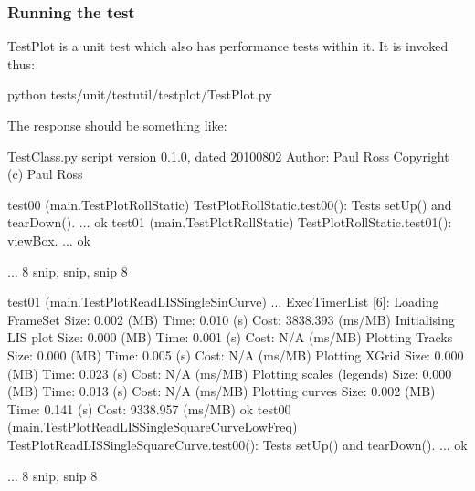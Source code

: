 \documentclass[letterpaper,10pt,english]{sphinxmanual}
\begin{document}
\subsubsection{Running the test}
\label{\detokenize{testing/test_plot:running-the-test}}
TestPlot is a unit test which also has performance tests within it. It is invoked thus:

\begin{sphinxVerbatim}[commandchars=\\\{\}]
\PYGZdl{} python tests/unit/test\PYGZus{}util/test\PYGZus{}plot/TestPlot.py
\end{sphinxVerbatim}

The response should be something like:

\begin{sphinxVerbatim}[commandchars=\\\{\}]
TestClass.py script version \PYGZdq{}0.1.0\PYGZdq{}, dated 2010\PYGZhy{}08\PYGZhy{}02
Author: Paul Ross
Copyright (c) Paul Ross

test\PYGZus{}00 (\PYGZus{}\PYGZus{}main\PYGZus{}\PYGZus{}.TestPlotRollStatic)
TestPlotRollStatic.test\PYGZus{}00(): Tests setUp() and tearDown(). ... ok
test\PYGZus{}01 (\PYGZus{}\PYGZus{}main\PYGZus{}\PYGZus{}.TestPlotRollStatic)
TestPlotRollStatic.test\PYGZus{}01(): viewBox. ... ok

... 8\PYGZlt{}\PYGZhy{}\PYGZhy{}\PYGZhy{}\PYGZhy{}\PYGZhy{}\PYGZhy{}\PYGZhy{}\PYGZhy{} snip, snip, snip \PYGZhy{}\PYGZhy{}\PYGZhy{}\PYGZhy{}\PYGZhy{}\PYGZhy{}\PYGZhy{}\PYGZhy{}\PYGZgt{}8

test\PYGZus{}01 (\PYGZus{}\PYGZus{}main\PYGZus{}\PYGZus{}.TestPlotReadLIS\PYGZus{}SingleSinCurve) ...  ExecTimerList [6]:
 Loading FrameSet          Size:    0.002 (MB) Time:    0.010 (s) Cost:   3838.393 (ms/MB)
 Initialising LIS plot     Size:    0.000 (MB) Time:    0.001 (s) Cost:        N/A (ms/MB)
 Plotting Tracks           Size:    0.000 (MB) Time:    0.005 (s) Cost:        N/A (ms/MB)
 Plotting XGrid            Size:    0.000 (MB) Time:    0.023 (s) Cost:        N/A (ms/MB)
 Plotting scales (legends) Size:    0.000 (MB) Time:    0.013 (s) Cost:        N/A (ms/MB)
 Plotting curves           Size:    0.002 (MB) Time:    0.141 (s) Cost:   9338.957 (ms/MB)  ok
test\PYGZus{}00 (\PYGZus{}\PYGZus{}main\PYGZus{}\PYGZus{}.TestPlotReadLIS\PYGZus{}SingleSquareCurveLowFreq)
TestPlotReadLIS\PYGZus{}SingleSquareCurve.test\PYGZus{}00(): Tests setUp() and tearDown(). ... ok

... 8\PYGZlt{}\PYGZhy{}\PYGZhy{}\PYGZhy{}\PYGZhy{}\PYGZhy{}\PYGZhy{}\PYGZhy{}\PYGZhy{} snip, snip \PYGZhy{}\PYGZhy{}\PYGZhy{}\PYGZhy{}\PYGZhy{}\PYGZhy{}\PYGZhy{}\PYGZhy{}\PYGZgt{}8


\end{sphinxVerbatim}
\end{document}
